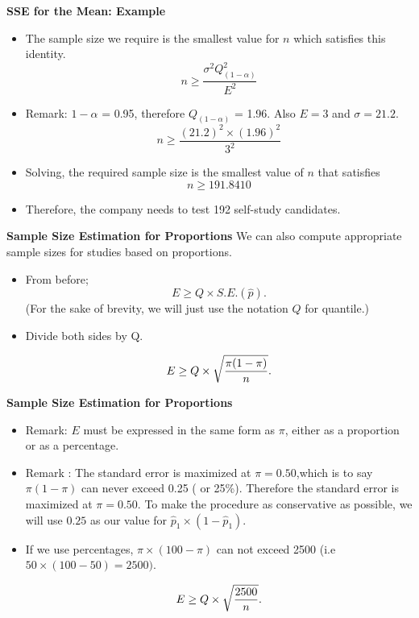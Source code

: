 \documentclass[]{report}
\begin{document}

\textbf{SSE for the Mean: Example}

\begin{itemize}
\item  The sample size we require is the smallest value for $n$ which satisfies this identity.
\[ n \geq \frac{\sigma^2 Q^2_{(1-\alpha)}}{E^2}  \]
\item  Remark: $1-\alpha$ = 0.95, therefore $Q_{(1-\alpha)}$ = 1.96. Also $E=3$ and $\sigma =21.2$.
\[ n \geq \frac{(21.2)^2 \times (1.96)^2}{3^2} \]
\item  Solving, the required sample size is the smallest value of $n$ that satisfies
\[ n \geq 191.8410 \]
\item  Therefore, the company needs to test 192 self-study candidates.
\end{itemize}



\textbf{Sample Size Estimation for Proportions}
We can also compute appropriate sample sizes for studies based on proportions.
\begin{itemize}
\item  From before; \[ E \geq Q \times S.E.(\hat{p}). \]
(For the sake of brevity, we will just use the notation $Q$ for quantile.)

\item  Divide both sides by Q.

\[ E \geq Q \times \sqrt{ {\pi(1-\pi)  \over n} }. \]

\end{itemize}



\textbf{Sample Size Estimation for Proportions}
\begin{itemize}
\item  Remark: $E$ must be expressed in the same form as $\pi$, either as a proportion or as a percentage.
\item  Remark : The standard error is maximized at $\pi = 0.50$,which is to say $\pi(1-\pi)$ can never exceed 0.25 ( or 25\%). Therefore the standard error is maximized at $\pi = 0.50$. To make the procedure as conservative as possible, we will use $0.25$ as our value for $\hat{p}_1 \times (1 - \hat{p}_1)$.
\item  If we use percentages, $\pi \times (100-\pi)$ can not exceed 2500 (i.e $ 50 \times (100-50)=2500)$.

\[ E \geq Q \times \sqrt{{2500 \over n}}. \]


\end{itemize}
\end{document}
